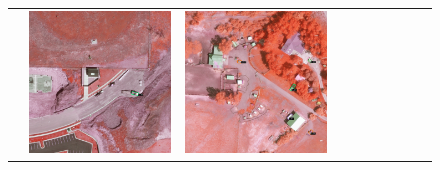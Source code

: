 \begin{figure}[H]
\begin{tabularx}{\textwidth}{c|*{9}{X}}
    & \includegraphics[trim={440pt 360pt 460pt 555pt},clip,width=\linewidth]{images/015Results/02perm_exp/comp_images/rgir/427.png}
    & \includegraphics[trim={740pt 420pt 180pt 510pt},clip,width=\linewidth]{images/015Results/02perm_exp/comp_images/rgir/523.png}

\end{tabularx}
\end{figure}
